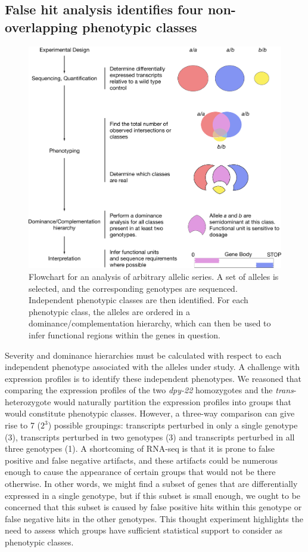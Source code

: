 \documentclass[8pt, twocolumn]{article}
\newcommand{\gene}[1]{\mbox{\emph{#1}}}
\newcommand{\dpy}[1]{\gene{dpy-22#1}}
\begin{document}
\subsection*{False hit analysis identifies four non-overlapping phenotypic
             classes}

\begin{figure}
 \centering{}
 \includegraphics[width=\textwidth]{../figs/flowchart.pdf}
 \caption{
         Flowchart for an analysis of arbitrary allelic series. A set of alleles
         is selected, and the corresponding genotypes are sequenced. Independent
         phenotypic classes are then identified. For each phenotypic class, the
         alleles are ordered in a dominance/complementation hierarchy, which can
         then be used to infer functional regions within the genes in question.
         }
\label{fig:flowchart}
\end{figure}

Severity and dominance hierarchies must be calculated with respect to each
independent phenotype associated with the alleles under study. A challenge with
expression profiles is to identify these independent phenotypes. We reasoned
that comparing the expression profiles of the two \dpy{} homozygotes and the
\emph{trans}-heterozygote would naturally partition the expression profiles into
groups that would constitute phenotypic classes. However, a three-way comparison
can give rise to 7 ($2^3$) possible groupings: transcripts perturbed in only a
single genotype (3), transcripts perturbed in two genotypes (3) and transcripts
perturbed in all three genotypes (1). A shortcoming of RNA-seq is that it is
prone to false positive and false negative artifacts, and these artifacts could
be numerous enough to cause the appearance of certain groups that would not
be there otherwise. In other words, we might find a subset of genes that are
differentially expressed in a single genotype, but if this subset is small
enough, we ought to be concerned that this subset is caused by false positive
hits within this genotype or false negative hits in the other genotypes. This
thought experiment highlights the need to assess which groups have sufficient
statistical support to consider as phenotypic classes.
\end{document}
